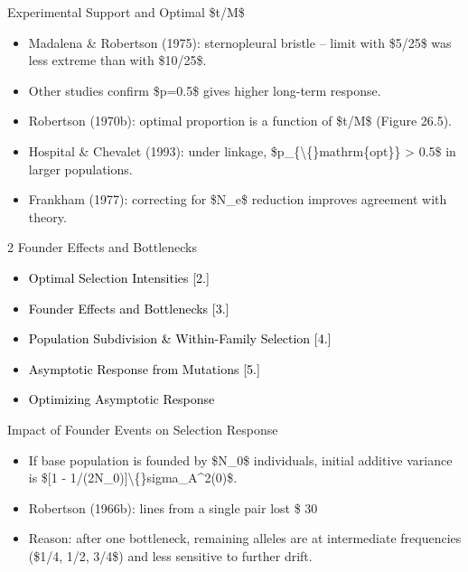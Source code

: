 \documentclass[10pt, aspectratio=169]{ctexbeamer}
\newcommand{\kgimageplaceholder}[2][]{\begin{center}\fbox{\parbox[c][0.28\textheight][c]{0.34\textwidth}{\centering #2}}\end{center}}
\begin{document}
\begin{frame}{Experimental Support and Optimal \$t/M\$}
  \kgimageplaceholder[figure=Figure 26.5,center,x=469,y=149,width=349,height=244]{Figure 26.5}
  \begin{itemize}
    \item Madalena \& Robertson (1975): sternopleural bristle -- limit with \$5/25\$ was less extreme than with \$10/25\$.
    \item Other studies confirm \$p=0.5\$ gives higher long-term response.
    \item Robertson (1970b): optimal proportion is a function of \$t/M\$ (Figure 26.5).
    \item Hospital \& Chevalet (1993): under linkage, \$p\_\{\textbackslash\{\}mathrm\{opt\}\} > 0.5\$ in larger populations.
    \item Frankham (1977): correcting for \$N\_e\$ reduction improves agreement with theory.
  \end{itemize}
\end{frame}

\begin{frame}{2 Founder Effects and Bottlenecks}
  \vfill
  \begin{center}
    \begin{minipage}{0.7\textwidth}
      \begin{itemize}
        \setlength{\itemsep}{0.3\baselineskip}
        \item[\textcolor{black}{\textbf{1.}}] \textcolor{black}{Optimal Selection Intensities [2.]}
        \item[\textcolor{black}{\textbf{2.}}] \textcolor{black}{Founder Effects and Bottlenecks [3.]}
        \item[\textcolor{black}{\textbf{3.}}] \textcolor{black}{Population Subdivision \& Within-Family Selection [4.]}
        \item[\textcolor{black}{\textbf{4.}}] \textcolor{black}{Asymptotic Response from Mutations [5.]}
        \item[\textcolor{black}{\textbf{5.}}] \textcolor{black}{Optimizing Asymptotic Response}
      \end{itemize}
    \end{minipage}
  \end{center}
  \vfill
\end{frame}

\begin{frame}{Impact of Founder Events on Selection Response}
  \begin{itemize}
    \item If base population is founded by \$N\_0\$ individuals, initial additive variance is \$[1 - 1/(2N\_0)]\textbackslash\{\}sigma\_A\textasciicircum{}2(0)\$.
    \item Robertson (1966b): lines from a single pair lost \$ 30
    \item Reason: after one bottleneck, remaining alleles are at intermediate frequencies (\$1/4, 1/2, 3/4\$) and less sensitive to further drift.
  \end{itemize}
\end{frame}
\end{document}
